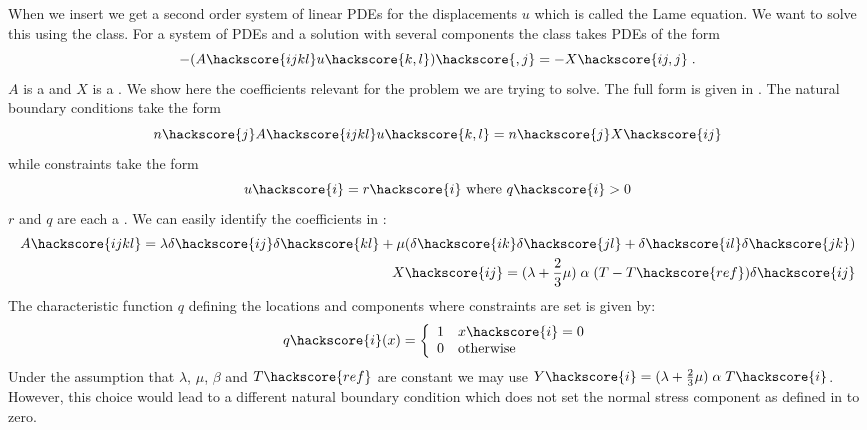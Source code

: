 When we insert  we get a second order system
of linear PDEs for the displacements $u$ which is called the Lame equation.
We want to solve this using the \LinearPDE class.
For a system of PDEs and a solution with several components the \LinearPDE class takes PDEs of the form
\begin{equation}\label{LINEARPDE.SYSTEM.1 TUTORIAL}
-(A\hackscore{ijkl} u\hackscore{k,l})\hackscore{,j}=-X\hackscore{ij,j} \; .
\end{equation}
$A$ is a \RankFour and $X$ is a \RankTwo.
We show here the coefficients relevant for the problem we are trying to solve.
The full form is given in .
The natural boundary conditions take the form
\begin{equation}\label{LINEARPDE.SYSTEM.2 TUTORIAL}
n\hackscore{j} A\hackscore{ijkl} u\hackscore{k,l}=n\hackscore{j}X\hackscore{ij}
\end{equation}
while constraints take the form
\begin{equation}\label{LINEARPDE.SYSTEM.3 TUTORIAL}
u\hackscore{i}=r\hackscore{i} \mbox{ where } q\hackscore{i}>0
\end{equation}
$r$ and $q$ are each a \RankOne.
We can easily identify the coefficients in :
\begin{eqnarray}\label{LINEARPDE ELASTIC COEFFICIENTS}
A\hackscore{ijkl}=\lambda \delta\hackscore{ij} \delta\hackscore{kl} + \mu (
\delta\hackscore{ik} \delta\hackscore{jl}
+ \delta\hackscore{il} \delta\hackscore{jk}) \\
X\hackscore{ij}=(\lambda+\frac{2}{3} \mu) \;  \alpha \; (T-T\hackscore{ref})\delta\hackscore{ij} \\
\end{eqnarray}
The characteristic function $q$ defining the locations and components where constraints are set is given by:
\begin{equation}\label{HEATEDBLOCK MASK}
q\hackscore{i}(x)=\left\{
\begin{array}{cl}
1 & x\hackscore{i}=0\\
0 & \mbox{otherwise}\\
\end{array}
\right.
\end{equation}
Under the assumption that $\lambda$, $\mu$, $\beta$ and $T\hackscore{ref}$
are constant we may use $Y\hackscore{i}=(\lambda+\frac{2}{3} \mu) \; \alpha \; T\hackscore{i}$.
However, this choice would lead to a different natural boundary condition
which does not set the normal stress component as defined in  to zero.

